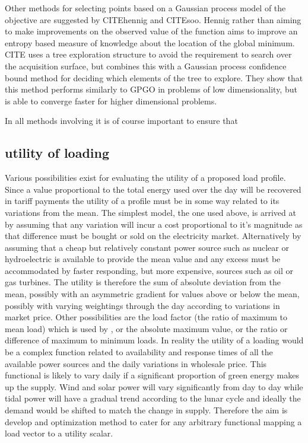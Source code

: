\documentclass[a4paper, 10 pt, conference]{ieeeconf}  %
\begin{document}
Other methods for selecting points based on a Gaussian process model of the objective are suggested by CITEhennig and CITEsoo. Hennig rather than aiming to make improvements on the observed value of the function aims to improve an entropy based measure of knowledge about the location of the global minimum. CITE uses a tree exploration structure to avoid the requirement to search over the acquisition surface, but combines this with a Gaussian process confidence bound method for deciding which elements of the tree to explore. They show that this method performs similarly to GPGO in problems of low dimensionality, but is able to converge faster for higher dimensional problems.

In all methods involving it is of course important to ensure that
\subsection{utility of loading}
Various possibilities exist for evaluating the utility of a proposed load profile. Since a value proportional to the total energy used over the day will be recovered in tariff payments the utility of a profile must be in some way related to its variations from the mean. The simplest model, the one used above, is arrived at by assuming that any variation will incur a cost proportional to it's magnitude as that difference must be bought or sold on the electricity market. Alternatively by assuming that a cheap but relatively constant power source such as nuclear or hydroelectric is available to provide the mean value and any excess must be accommodated by faster responding, but more expensive, sources such as oil or gas turbines. The utility is therefore the sum of absolute deviation from the mean, possibly with an asymmetric gradient for values above or below the mean, possibly with varying weightings through the day according to variations in market price.
Other possibilities are the load factor (the ratio of maximum to mean load) which is used by \cite{ramchurn2011agent}, or the absolute maximum value, or the ratio or difference of maximum to minimum loads. In reality the utility of a loading would be a complex function related to availability and response times of all the available power sources and the daily variations in wholesale price. This functional is likely to vary daily if a significant proportion of green energy makes up the supply. Wind and solar power will vary significantly from day to day while tidal power will have a gradual trend according to the lunar cycle and ideally the demand would be shifted to match the change in supply. Therefore the aim is develop and optimization method to cater for any arbitrary functional mapping a load vector to a utility scalar.
\end{document}
